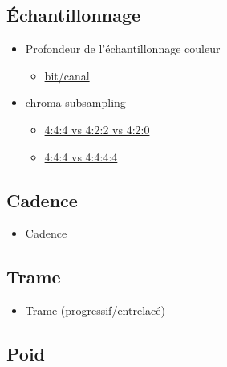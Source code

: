 \documentclass[
]{book}
\providecommand{\tightlist}{%
  \setlength{\itemsep}{0pt}\setlength{\parskip}{0pt}}
\begin{document}
\hypertarget{uxe9chantillonnage}{%
\subsection{Échantillonnage}\label{uxe9chantillonnage}}

\begin{itemize}
\tightlist
\item
  Profondeur de l'échantillonnage couleur

  \begin{itemize}
  \tightlist
  \item
    \href{https://en.wikipedia.org/wiki/Color_depth}{bit/canal}\\
  \end{itemize}
\item
  \href{https://en.wikipedia.org/wiki/Chroma_subsampling\#Sampling_systems_and_ratios}{chroma subsampling}

  \begin{itemize}
  \tightlist
  \item
    \href{https://upload.wikimedia.org/wikipedia/commons/0/06/Colorcomp.jpg}{4:4:4 vs 4:2:2 vs 4:2:0}
  \item
    \href{https://en.wikipedia.org/wiki/Alpha_compositing}{4:4:4 vs 4:4:4:4}
  \end{itemize}
\end{itemize}

\hypertarget{cadence}{%
\subsection{Cadence}\label{cadence}}

\begin{itemize}
\tightlist
\item
  \href{https://frames-per-second.appspot.com}{Cadence}
\end{itemize}

\hypertarget{trame}{%
\subsection{Trame}\label{trame}}

\begin{itemize}
\tightlist
\item
  \href{https://web.archive.org/web/20140222010640/http://neuron2.net/LVG/interlacing.html}{Trame (progressif/entrelacé)}
\end{itemize}

\hypertarget{poid}{%
\subsection{Poid}\label{poid}}
\end{document}
